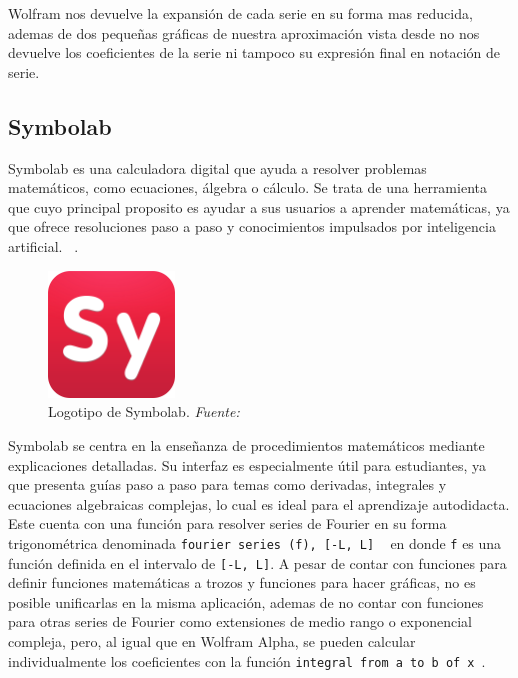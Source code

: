 Wolfram nos devuelve la expansión de cada serie en su forma mas reducida, ademas de dos pequeñas gráficas de nuestra aproximación vista desde  no nos devuelve los coeficientes de la serie ni tampoco su expresión final en notación de serie.

\subsection{Symbolab}
Symbolab es una calculadora digital que ayuda a resolver problemas matemáticos, como ecuaciones, álgebra o cálculo. Se trata de una herramienta que cuyo principal proposito es ayudar a sus usuarios a aprender matemáticas, ya que ofrece resoluciones paso a paso y conocimientos impulsados por inteligencia artificial. ~\cite{symbolabDocs}. 
\begin{figure}[H]
	\centering
	\includegraphics[width=0.3\textwidth]{img/chapter02/logo_symbolab.png}
	\caption[Logotipo de Symbolab.]{Logotipo de Symbolab. \textit{Fuente: ~\cite{symbolabDocs}}}
	\label{fig:logo-symbolab}  %
\end{figure}
Symbolab se centra en la enseñanza de procedimientos matemáticos mediante explicaciones detalladas. Su interfaz es especialmente útil para estudiantes, ya que presenta guías paso a paso para temas como derivadas, integrales y ecuaciones algebraicas complejas, lo cual es ideal para el aprendizaje autodidacta. Este cuenta con una función para resolver series de Fourier en su forma trigonométrica denominada \texttt{fourier series (f), [-L, L]} ~\cite{symbolabDocs} en donde \texttt{f} es una función definida en el intervalo de \texttt{[-L, L]}. A pesar de contar con funciones para definir funciones matemáticas a trozos y funciones para hacer gráficas, no es posible unificarlas en la misma aplicación, ademas de no contar con funciones para otras series de Fourier como extensiones de medio rango o exponencial compleja, pero, al igual que en Wolfram Alpha, se pueden calcular individualmente los coeficientes con la función \texttt{integral from a to b of x}~\cite{symbolabDocs}.

